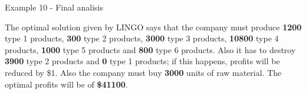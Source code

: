 \begin{frame}{Example 10 - Final analisis}

The optimal solution given by LINGO says that the company must produce
\textbf{1200} type 1 products, \textbf{300} type 2 products, \textbf{3000} type
3 products, \textbf{10800} type 4 products, \textbf{1000} type 5 products and
\textbf{800} type 6 products.
Also it has to destroy \textbf{3900} type 2 products and \textbf{0} type 1
products; if this happens, profits will be reduced by \$1. Also the company must
buy \textbf{3000} units of raw material. The optimal profits will be of
\textbf{\$41100}.

\end{frame}
